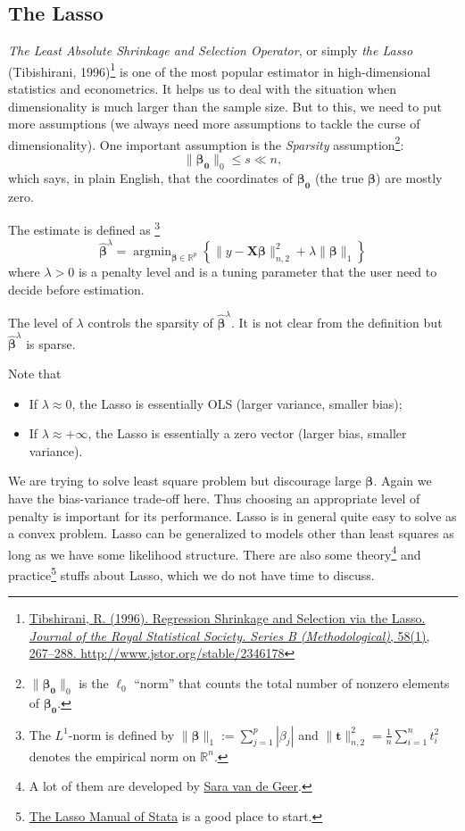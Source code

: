 \documentclass[11pt,a4paper]{amsart}
\theoremstyle{plain}
\theoremstyle{definition}
\begin{document}
\subsection{The Lasso}\hfill\par 
	\textit{The Least Absolute Shrinkage and Selection Operator}, or simply \textit{the Lasso} (Tibishirani, 1996)\footnote{\href{https://www.jstor.org/stable/2346178?seq=1}{Tibshirani, R. (1996). Regression Shrinkage and Selection via the Lasso. \textit{Journal of the Royal Statistical Society. Series B (Methodological)}, 58(1), 267–288. http://www.jstor.org/stable/2346178}} is one of the most popular estimator in high-dimensional statistics and econometrics. It helps us to deal with the situation when dimensionality is much larger than the sample size. But to this, we need to put more assumptions (we always need more assumptions to tackle the curse of dimensionality). One important assumption is the \textit{Sparsity} assumption\footnote{$\|\bm{\beta_{0}}\|_{0} $ is the $\ell_{0}$ ``norm'' that counts the total number of nonzero elements of $\bm{\beta_{0}}$. }:
	\[	\|\bm{\beta_{0}}\|_{0} \leq s \ll n,	\]
	which says, in plain English, that the coordinates of $\bm{\beta_{0}}$ (the true $\bm{\beta}$) are mostly zero. \par 
	The estimate is defined as \footnote{The $L^{1}$-norm is defined by $\|\bm{\beta}\|_{1} := \sum_{j=1}^{p} |\beta_{j}|$ and  $\|\bm{t}\|_{n, 2}^{2}=\frac{1}{n} \sum_{i=1}^{n} t_{i}^{2}$ denotes the empirical norm on $ \mathbb{R}^{n}$.}
	\[	\widehat{\bm{\beta}}^{\lambda} = \operatorname{argmin}_{\bm{\beta} \in \mathbb{R}^{p}} \left\{\|y-\mathbf{X} \bm{\beta}\|_{n, 2}^{2}+\lambda\|\bm{\beta}\|_{1}\right\}	\]
	where $\lambda > 0$ is a penalty level and is a tuning parameter that the user need to decide before estimation.\par 
	The level of $\lambda$ controls the sparsity of $\widehat{\bm{\beta}}^{\lambda}$. It is not clear from the definition but $\widehat{\bm{\beta}}^{\lambda}$ is sparse.\par 
	Note that 
	\begin{itemize}
		\item If $\lambda \approx 0$, the Lasso is essentially OLS (larger variance, smaller bias);
		\item If $\lambda \approx +\infty$, the Lasso is essentially a zero vector (larger bias, smaller variance).
	\end{itemize}

	We are trying to solve least square problem but discourage large $\bm{\beta}$. Again we have the bias-variance trade-off here. Thus choosing an appropriate level of penalty is important for its performance. Lasso is in general quite easy to solve as a convex problem. Lasso can be generalized to models other than least squares as long as we have some likelihood structure. There are also some theory\footnote{A lot of them are developed by \href{https://stat.ethz.ch/~vsara/}{Sara van de Geer}.} and practice\footnote{ \href{https://www.stata.com/manuals/lasso.pdf}{The Lasso Manual of Stata} is a good place to start.} stuffs about Lasso, which we do not have time to discuss. 
	
\end{document}
